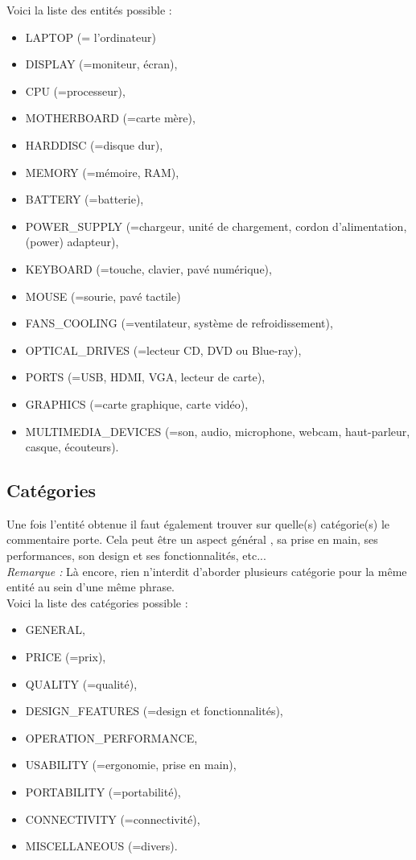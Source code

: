 \documentclass[12pt ,a4paper ]{article}
\begin{document}
\begin{multicols}{2}
\noindent Voici la liste des entités possible : 
\begin{itemize}
\item LAPTOP (= l'ordinateur)
\item DISPLAY (=moniteur, écran), 
\item CPU (=processeur), 
\item MOTHERBOARD (=carte mère),
\item HARDDISC (=disque dur), 
\item MEMORY (=mémoire, RAM), 
\item BATTERY (=batterie), 
\item POWER\_SUPPLY (=chargeur, unité de chargement, cordon d'alimentation, (power) adapteur),
\item KEYBOARD (=touche, clavier, pavé numérique), 
\item MOUSE (=sourie, pavé tactile)
\item FANS\_COOLING (=ventilateur, système de refroidissement), 
\item OPTICAL\_DRIVES (=lecteur CD, DVD ou Blue-ray),
\item PORTS (=USB, HDMI, VGA, lecteur de carte),
\item GRAPHICS (=carte graphique, carte vidéo),
\item MULTIMEDIA\_DEVICES (=son, audio, microphone, webcam, haut-parleur, casque, écouteurs).
\end{itemize}				

\subsection{Catégories}
\noindent Une fois l'entité obtenue il faut également trouver sur quelle(s) catégorie(s) le commentaire porte. Cela peut être un aspect général , sa prise en main, ses performances, son design et ses fonctionnalités, etc... \\

\noindent\textit{Remarque : }Là encore, rien n'interdit d'aborder plusieurs catégorie pour la même entité au sein d'une même phrase.\\

\noindent Voici la liste des catégories possible : 
\begin{itemize}
\item GENERAL, 
\item PRICE (=prix), 
\item QUALITY (=qualité), 
\item DESIGN\_FEATURES (=design et fonctionnalités),
\item OPERATION\_PERFORMANCE, 
\item USABILITY (=ergonomie, prise en main), 
\item PORTABILITY (=portabilité),
\item CONNECTIVITY (=connectivité), 
\item MISCELLANEOUS (=divers).
\end{itemize}	


\end{multicols}
\end{document}
